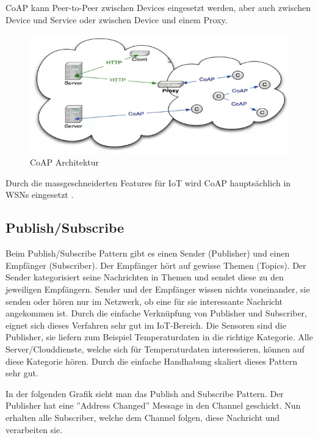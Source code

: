 CoAP kann Peer-to-Peer zwischen Devices eingesetzt werden, aber auch zwischen Device und Service oder zwischen Device und einem Proxy.
\begin{figure}[H]
\centering
\includegraphics[scale=0.8]{../02_Analyse/images/coap_architecture.png}
\caption{CoAP Architektur \cite{Shelby14}}
\end{figure}
  
Durch die massgeschneiderten Features für IoT wird CoAP hauptsächlich in WSNs eingesetzt \cite{Obermaier15}. 
\newpage

\subsection{Publish/Subscribe}
Beim Publish/Subscribe Pattern gibt es einen Sender (Publisher) und einen Empfänger (Subscriber). Der Empfänger hört auf gewisse Themen (Topics). Der Sender kategorisiert seine Nachrichten in Themen und sendet diese zu den jeweiligen Empfängern. Sender und der Empfänger wissen nichts voneinander,  sie senden oder hören nur im Netzwerk, ob eine für sie interessante Nachricht angekommen ist. Durch die einfache Verknüpfung von Publisher und Subscriber, eignet sich dieses Verfahren sehr gut im IoT-Bereich. Die Sensoren sind die Publisher, sie liefern zum Beispiel Temperaturdaten in die richtige Kategorie. Alle Server/Clouddienste, welche sich für Temperaturdaten interessieren, können auf diese Kategorie hören. Durch die einfache Handhabung skaliert dieses Pattern sehr gut.

In der folgenden Grafik sieht man das Publish and Subscribe Pattern. Der Publisher hat eine ''Address Changed'' Message in den Channel geschickt. Nun erhalten alle Subscriber, welche dem Channel folgen, diese Nachricht und verarbeiten sie.

